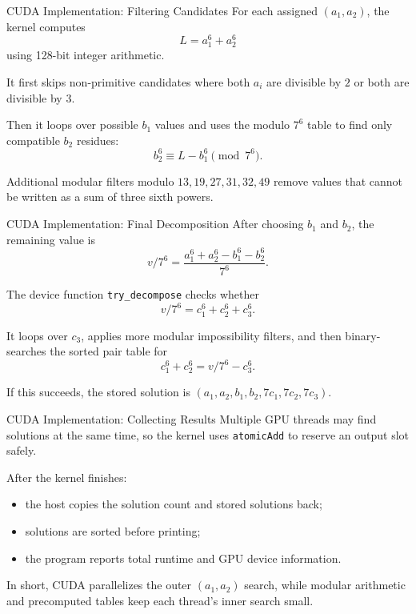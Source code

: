 \documentclass[]{beamer}
\begin{document}
\begin{frame}{CUDA Implementation: Filtering Candidates}
  For each assigned $(a_1,a_2)$, the kernel computes
  \begin{equation*}
    L = a_1^6 + a_2^6
  \end{equation*}
  using 128-bit integer arithmetic.
  \pause

  It first skips non-primitive candidates where both $a_i$ are divisible by
  $2$ or both are divisible by $3$.
  \pause
  \bigskip

  Then it loops over possible $b_1$ values and uses the modulo $7^6$ table to
  find only compatible $b_2$ residues:
  \begin{equation*}
    b_2^6 \equiv L - b_1^6 \pmod{7^6}.
  \end{equation*}
  \pause

  Additional modular filters modulo $13,19,27,31,32,49$ remove values that
  cannot be written as a sum of three sixth powers.
\end{frame}

\begin{frame}{CUDA Implementation: Final Decomposition}
  After choosing $b_1$ and $b_2$, the remaining value is
  \begin{equation*}
    v/7^6 =
    \frac{a_1^6 + a_2^6 - b_1^6 - b_2^6}{7^6}.
  \end{equation*}
  \pause

  The device function \texttt{try\_decompose} checks whether
  \begin{equation*}
    v/7^6 = c_1^6 + c_2^6 + c_3^6.
  \end{equation*}
  \pause

  It loops over $c_3$, applies more modular impossibility filters, and then
  binary-searches the sorted pair table for
  \begin{equation*}
    c_1^6 + c_2^6 = v/7^6 - c_3^6.
  \end{equation*}
  \pause

  If this succeeds, the stored solution is
  $(a_1,a_2,b_1,b_2,7c_1,7c_2,7c_3)$.
\end{frame}

\begin{frame}{CUDA Implementation: Collecting Results}
  Multiple GPU threads may find solutions at the same time, so the kernel uses
  \texttt{atomicAdd} to reserve an output slot safely.
  \pause
  \bigskip

  After the kernel finishes:
  \begin{itemize}
    \item the host copies the solution count and stored solutions back;
    \item solutions are sorted before printing;
    \item the program reports total runtime and GPU device information.
  \end{itemize}
  \pause

  In short, CUDA parallelizes the outer $(a_1,a_2)$ search, while modular
  arithmetic and precomputed tables keep each thread's inner search small.
\end{frame}
\end{document}
